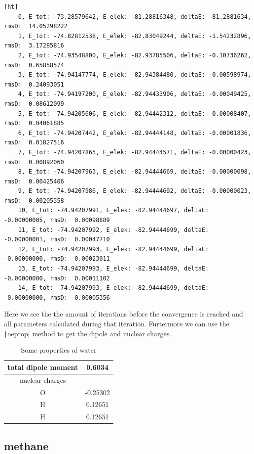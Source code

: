 \documentclass[%
    paper=A4,               %
    twoside=true,           %
    openany,              %
    parskip=full,           %
    chapterprefix=true,     %
    11pt,                   %
    headings=normal,        %
    bibliography=totoc,     %
    listof=totoc,           %
    titlepage=on,           %
    captions=tableabove,    %
    draft=false,            %
]{scrreprt}
\numberwithin{equation}{section}
\begin{document}
    \begin{verbatim}[ht]
    0, E_tot: -73.28579642, E_elek: -81.28816348, deltaE: -81.2881634, rmsD:  14.05298222
    1, E_tot: -74.82812538, E_elek: -82.83049244, deltaE: -1.54232896, rmsD:  3.17285816 
    2, E_tot: -74.93548800, E_elek: -82.93785506, deltaE: -0.10736262, rmsD:  0.65858574 
    3, E_tot: -74.94147774, E_elek: -82.94384480, deltaE: -0.00598974, rmsD:  0.24093051 
    4, E_tot: -74.94197200, E_elek: -82.94433906, deltaE: -0.00049425, rmsD:  0.08612099
    5, E_tot: -74.94205606, E_elek: -82.94442312, deltaE: -0.00008407, rmsD:  0.04061885
    6, E_tot: -74.94207442, E_elek: -82.94444148, deltaE: -0.00001836, rmsD:  0.01827516
    7, E_tot: -74.94207865, E_elek: -82.94444571, deltaE: -0.00000423, rmsD:  0.00892060
    8, E_tot: -74.94207963, E_elek: -82.94444669, deltaE: -0.00000098, rmsD:  0.00425406
    9, E_tot: -74.94207986, E_elek: -82.94444692, deltaE: -0.00000023, rmsD:  0.00205358
    10, E_tot: -74.94207991, E_elek: -82.94444697, deltaE: -0.00000005, rmsD:  0.00098889
    11, E_tot: -74.94207992, E_elek: -82.94444699, deltaE: -0.00000001, rmsD:  0.00047710
    12, E_tot: -74.94207993, E_elek: -82.94444699, deltaE: -0.00000000, rmsD:  0.00023011
    13, E_tot: -74.94207993, E_elek: -82.94444699, deltaE: -0.00000000, rmsD:  0.00011102
    14, E_tot: -74.94207993, E_elek: -82.94444699, deltaE: -0.00000000, rmsD:  0.00005356
    \end{verbatim}
    Here we see the the amount of iterations before the convergence is reached and all parameters calculated during that iteration. Furtermore we can use the \texttt|oeprop| method to get the dipole and nuclear charges.
    \begin{table}[ht]
        \centering
        \begin{tabular}{c|c}
             total dipole moment & 0.6034  \\
             \hline
             nuclear charges &  \\ 
             \hline
             O & -0.25302 \\
             H & 0.12651 \\
             H & 0.12651 \\
        \end{tabular}
        \caption{Some properties of water}
        \label{tab:number2}
    \end{table}
     
    \subsection{methane}
    \label{subsec:methane}
     
\end{document}
